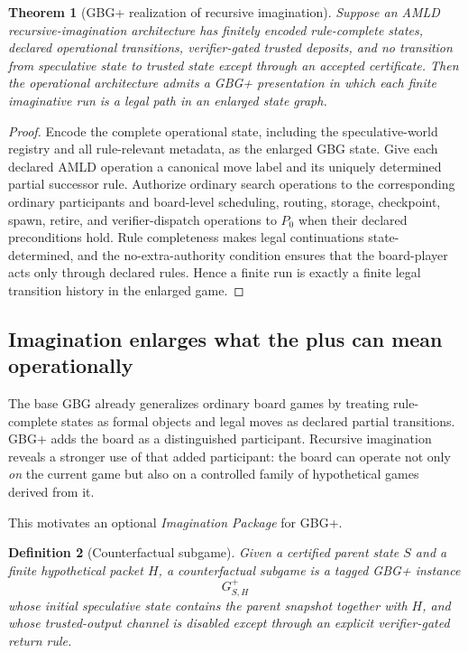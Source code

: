 \documentclass[11pt]{article}
\newtheorem{definition}{Definition}[section]
\newtheorem{theorem}[definition]{Theorem}
\begin{document}
\begin{theorem}[GBG+ realization of recursive imagination]
Suppose an AMLD recursive-imagination architecture has finitely encoded rule-complete states, declared operational transitions, verifier-gated trusted deposits, and no transition from speculative state to trusted state except through an accepted certificate.  Then the operational architecture admits a GBG+ presentation in which each finite imaginative run is a legal path in an enlarged state graph.
\end{theorem}

\begin{proof}
Encode the complete operational state, including the speculative-world registry and all rule-relevant metadata, as the enlarged GBG state.  Give each declared AMLD operation a canonical move label and its uniquely determined partial successor rule.  Authorize ordinary search operations to the corresponding ordinary participants and board-level scheduling, routing, storage, checkpoint, spawn, retire, and verifier-dispatch operations to $P_0$ when their declared preconditions hold.  Rule completeness makes legal continuations state-determined, and the no-extra-authority condition ensures that the board-player acts only through declared rules.  Hence a finite run is exactly a finite legal transition history in the enlarged game.
\end{proof}

\subsection{Imagination enlarges what the plus can mean operationally}

The base GBG already generalizes ordinary board games by treating rule-complete states as formal objects and legal moves as declared partial transitions.  GBG+ adds the board as a distinguished participant.  Recursive imagination reveals a stronger use of that added participant: the board can operate not only \emph{on} the current game but also on a controlled family of hypothetical games derived from it.

This motivates an optional \emph{Imagination Package} for GBG+.

\begin{definition}[Counterfactual subgame]
Given a certified parent state $S$ and a finite hypothetical packet $H$, a counterfactual subgame is a tagged GBG+ instance
\[
G^+_{S,H}
\]
whose initial speculative state contains the parent snapshot together with $H$, and whose trusted-output channel is disabled except through an explicit verifier-gated return rule.
\end{definition}
\end{document}

